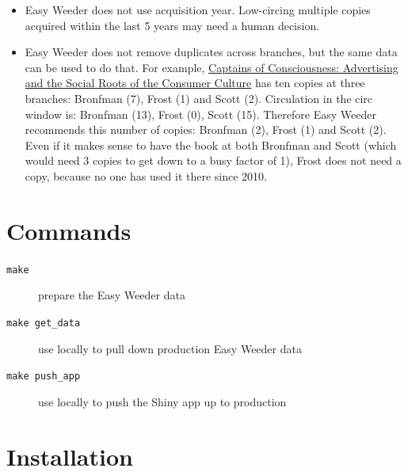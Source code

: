 \documentclass[11pt]{article}
\begin{document}
\begin{itemize}
\item Easy Weeder does not use acquisition year.  Low-circing multiple copies acquired within the last 5 years may need a human decision.
\item Easy Weeder does not remove duplicates across branches, but the same data can be used to do that. For example, \href{https://www.library.yorku.ca/find/Record/1172}{Captains of Consciousness: Advertising and the Social Roots of the Consumer Culture} has ten copies at three branches: Bronfman (7), Frost (1) and Scott (2).  Circulation in the circ window is: Bronfman (13), Frost (0), Scott (15).  Therefore Easy Weeder recommends this number of copies: Bronfman (2), Frost (1) and Scott (2).  Even if it makes sense to have the book at both Bronfman and Scott (which would need 3 copies to get down to a busy factor of 1), Frost does not need a copy, because no one has used it there since 2010.
\end{itemize}

\section*{Commands}
\label{sec:orge57671a}

\begin{description}
\item[{\texttt{make}}] prepare the Easy Weeder data
\item[{\texttt{make get\_data}}] use locally to pull down production Easy Weeder data
\item[{\texttt{make push\_app}}] use locally to push the Shiny app up to production
\end{description}

\section*{Installation}
\label{sec:org3676bf2}
\end{document}
